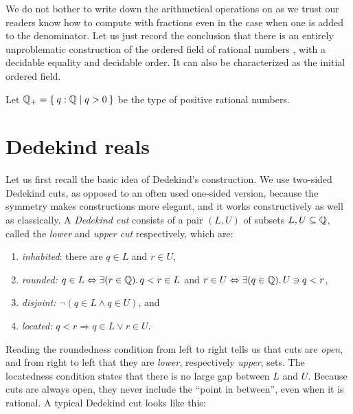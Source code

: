 We do not bother to write down the arithmetical operations on \Q as we trust our readers
know how to compute with fractions even in the case when one is added to the denominator.
Let us just record the conclusion that there is an entirely unproblematic construction of
the ordered field of rational numbers \Q, with a decidable equality and decidable order.
It can also be characterized as the initial ordered field.

Let $\Qp = \setof{ q : \Q | q > 0 }$ be the type of positive rational numbers.

\section{Dedekind reals}
\label{sec:dedekind-reals}

Let us first recall the basic idea of Dedekind's construction. We use two-sided Dedekind
cuts, as opposed to an often used one-sided version, because the symmetry makes
constructions more elegant, and it works constructively as well as classically. A
\emph{Dedekind cut} consists of a pair $(L, U)$ of subsets $L, U \subseteq \mathbb{Q}$, called the
\emph{lower} and \emph{upper cut} respectively, which are:
% 
\begin{enumerate}
\item \emph{inhabited}: there are $q \in L$ and $r \in U$,
\item \emph{rounded:} $q \in L \Leftrightarrow \exis {r \in \Q} q < r \in L$
  and $r \in U \Leftrightarrow \exis {q \in \Q} U \ni q < r$,
\item \emph{disjoint:} $\lnot (q \in L \land q \in U)$, and
\item \emph{located:} $q < r \Rightarrow q \in L \lor r \in U$.
\end{enumerate}
%
Reading the roundedness condition from left to right tells us that cuts are \emph{open},
and from right to left that they are \emph{lower}, respectively \emph{upper}, sets. The
locatedness condition states that there is no large gap between $L$ and $U$. Because cuts
are always open, they never include the ``point in between'', even when it is rational. A
typical Dedekind cut looks like this:
%
\begin{center}
\end{center}
